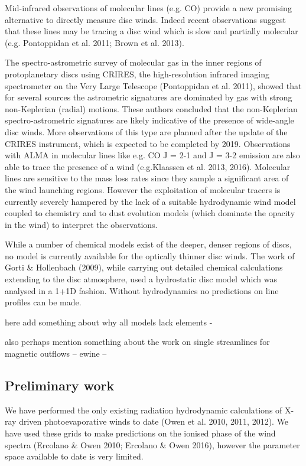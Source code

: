 \documentclass[10pt,fleqn,twoside]{article}
\begin{document}
Mid-infrared observations of molecular lines (e.g. CO) provide a new
promising alternative to directly measure disc winds. Indeed recent
observations suggest that these lines may be tracing a disc wind which
is slow and partially molecular (e.g. Pontoppidan et al. 2011; Brown et al. 2013). 

The spectro-astrometric survey of molecular gas in the inner regions of
protoplanetary discs using CRIRES, the high-resolution infrared
imaging spectrometer on the Very Large Telescope (Pontoppidan et
al. 2011), showed that for several sources the astrometric signatures
are dominated by gas with strong non-Keplerian (radial) motions. These
authors concluded that the non-Keplerian spectro-astrometric
signatures are likely indicative of the presence of wide-angle disc
winds. 
More observations of this type are planned after the update of
the CRIRES instrument, which is expected to be completed by
2019. Observations with ALMA in molecular lines like e.g. CO J = 2-1
and J = 3-2 emission are also able to trace the presence of a wind (e.g.Klaassen et al. 2013, 2016).  
Molecular lines are sensitive to the mass loss rates since they
sample a significant area of the wind launching regions. However the
exploitation of molecular tracers is currently severely hampered by
the lack of a suitable hydrodynamic wind model coupled to chemistry
and to dust evolution models (which dominate the opacity in the wind)
to interpret the observations.

 While a number of chemical models exist
of the deeper, denser regions of discs, no model is currently
available for the optically thinner disc winds. The work of Gorti \&
Hollenbach (2009), while carrying out detailed chemical calculations
extending to the disc atmosphere, used a hydrostatic disc model which
was analysed in a 1+1D fashion. Without hydrodynamics no predictions
on line profiles can be made.  

{\color{red} 

here add something about why all models lack elements -

  also perhaps mention something about the work on single streamlines
  for magnetic outflows  -- ewine --
}

\subsection{Preliminary work}
We have performed the only existing radiation hydrodynamic
calculations of X-ray driven photoevaporative winds to date (Owen et
al. 2010, 2011, 2012). We have used these grids to make predictions on
the ionised phase of the wind spectra (Ercolano \& Owen 2010;
Ercolano \& Owen 2016), however the parameter space
available to date is very limited. 
\end{document}
